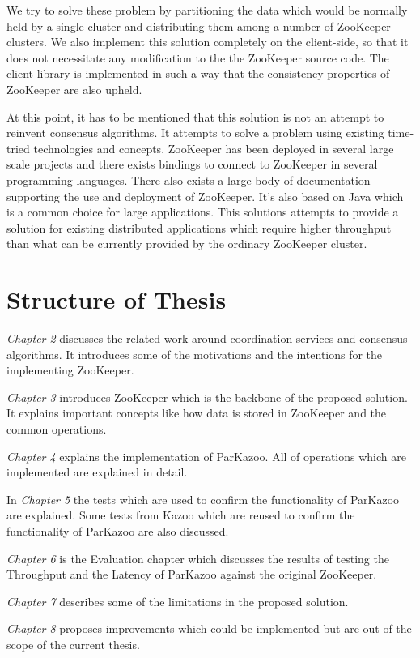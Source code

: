 We try to solve these problem by partitioning the data which would be normally held by a single cluster and distributing them among a number of ZooKeeper clusters. We also implement this solution completely on the client-side, so that it does not necessitate any modification to the the ZooKeeper source code. The client library is implemented in such a way that the consistency properties of ZooKeeper are also upheld.

At this point, it has to be mentioned that this solution is not an attempt to reinvent consensus algorithms. It attempts to solve a problem using existing time-tried technologies and concepts. ZooKeeper has been deployed in several large scale projects and there exists bindings to connect to ZooKeeper in several programming languages. There also exists a large body of documentation supporting the use and deployment of ZooKeeper. It's also based on Java which is a common choice for large applications. This solutions attempts to provide a solution for existing distributed applications which require higher throughput than what can be currently provided by the ordinary ZooKeeper cluster.

\section{Structure of Thesis}

\textit{Chapter 2} discusses the related work around coordination services and consensus algorithms. It introduces some of the motivations and the intentions for the implementing ZooKeeper.

\textit{Chapter 3} introduces ZooKeeper which is the backbone of the proposed solution. It explains important concepts like how data is stored in ZooKeeper and the common operations.

\textit{Chapter 4} explains the implementation of ParKazoo. All of operations which are implemented are explained in detail.

In \textit{Chapter 5} the tests which are used to confirm the functionality of ParKazoo are explained. Some tests from Kazoo which are reused to confirm the functionality of ParKazoo are also discussed.

\textit{Chapter 6} is the Evaluation chapter which discusses the results of testing the Throughput and the Latency of ParKazoo against the original ZooKeeper.

\textit{Chapter 7} describes some of the limitations in the proposed solution.

\textit{Chapter 8} proposes improvements which could be implemented but are out of the scope of the current thesis.
